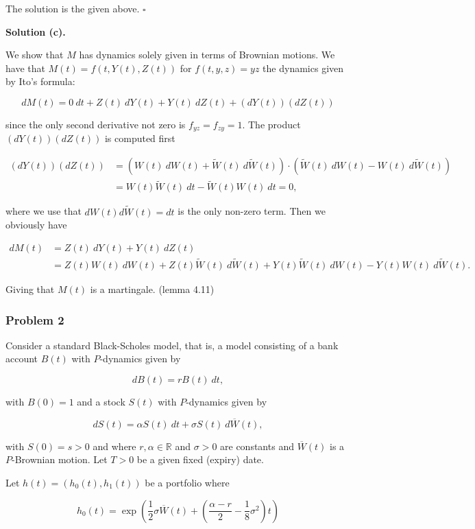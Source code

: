\documentclass[
]{article}
\begin{document}
The solution is the given above. \(\square\)

\textbf{Solution (c).}

We show that \(M\) has dynamics solely given in terms of Brownian
motions. We have that \(M(t)=f(t,Y(t),Z(t))\) for \(f(t,y,z)=yz\) the
dynamics given by Ito's formula:

\[
dM(t)=0\ dt+Z(t)\ dY(t)+Y(t)\ dZ(t)+(dY(t))(dZ(t))
\]

since the only second derivative not zero is \(f_{yz}=f_{zy}=1\). The
product \((dY(t))(dZ(t))\) is computed first

\begin{align*}
(dY(t))(dZ(t))&=(W(t)\ dW(t)+\widetilde{W}(t)\ d\widetilde{W}(t))\cdot(\widetilde{W}(t)\ dW(t)-W(t)\ d\widetilde{W}(t))\\
&=W(t)\widetilde{W}(t)\ dt-\widetilde{W}(t)W(t)\ dt=0,
\end{align*}

where we use that \(dW(t)d\widetilde{W}(t)=dt\) is the only non-zero
term. Then we obviously have

\begin{align*}
dM(t)&=Z(t)\ dY(t)+Y(t)\ dZ(t)\\
&=Z(t)W(t)\ dW(t)+Z(t)\widetilde{W}(t)\ d\widetilde{W}(t)+Y(t)\widetilde{W}(t)\ dW(t)-Y(t)W(t)\ d\widetilde{W}(t).
\end{align*}

Giving that \(M(t)\) is a martingale. (lemma 4.11)

\hypertarget{problem-2-2}{%
\subsubsection{Problem 2}\label{problem-2-2}}

Consider a standard Black-Scholes model, that is, a model consisting of
a bank account \(B(t)\) with \(P\)-dynamics given by

\[
dB(t)=rB(t)\ dt,
\]

with \(B(0)=1\) and a stock \(S(t)\) with \(P\)-dynamics given by

\[
dS(t)=\alpha S(t)\ dt+\sigma S(t)\ d\overline{W}(t),
\]

with \(S(0)=s>0\) and where \(r,\alpha\in\mathbb{R}\) and \(\sigma >0\)
are constants and \(\overline{W}(t)\) is a \(P\)-Brownian motion. Let
\(T>0\) be a given fixed (expiry) date.

Let \(h(t)=\left(h_0(t),h_1(t)\right)\) be a portfolio where

\[
h_0(t)=\exp\left(\frac{1}{2}\sigma\overline{W}(t)+\left(\frac{\alpha - r}{2}-\frac{1}{8}\sigma^2\right)t\right)
\]
\end{document}
